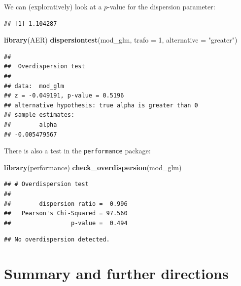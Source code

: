 \documentclass[
]{book}
\newenvironment{Shaded}{\begin{snugshade}}{\end{snugshade}}
\newcommand{\AttributeTok}[1]{\textcolor[rgb]{0.13,0.29,0.53}{#1}}
\newcommand{\CommentTok}[1]{\textcolor[rgb]{0.56,0.35,0.01}{\textit{#1}}}
\newcommand{\DecValTok}[1]{\textcolor[rgb]{0.00,0.00,0.81}{#1}}
\newcommand{\FunctionTok}[1]{\textcolor[rgb]{0.13,0.29,0.53}{\textbf{#1}}}
\newcommand{\NormalTok}[1]{#1}
\newcommand{\SpecialCharTok}[1]{\textcolor[rgb]{0.81,0.36,0.00}{\textbf{#1}}}
\newcommand{\StringTok}[1]{\textcolor[rgb]{0.31,0.60,0.02}{#1}}
\begin{document}
We can (exploratively) look at a \(p\)-value for the dispersion parameter:

\begin{Shaded}
\end{Shaded}

\begin{verbatim}
## [1] 1.104287
\end{verbatim}

\begin{Shaded}
\begin{Highlighting}[]
\FunctionTok{library}\NormalTok{(AER)}
\FunctionTok{dispersiontest}\NormalTok{(mod\_glm, }\AttributeTok{trafo =} \DecValTok{1}\NormalTok{, }\AttributeTok{alternative =} \StringTok{"greater"}\NormalTok{) }
\end{Highlighting}
\end{Shaded}

\begin{verbatim}
## 
##  Overdispersion test
## 
## data:  mod_glm
## z = -0.049191, p-value = 0.5196
## alternative hypothesis: true alpha is greater than 0
## sample estimates:
##        alpha 
## -0.005479567
\end{verbatim}

There is also a test in the \texttt{performance} package:

\begin{Shaded}
\begin{Highlighting}[]
\FunctionTok{library}\NormalTok{(performance)}
\FunctionTok{check\_overdispersion}\NormalTok{(mod\_glm)}
\end{Highlighting}
\end{Shaded}

\begin{verbatim}
## # Overdispersion test
## 
##        dispersion ratio =  0.996
##   Pearson's Chi-Squared = 97.560
##                 p-value =  0.494
\end{verbatim}

\begin{verbatim}
## No overdispersion detected.
\end{verbatim}

\section{Summary and further directions}\label{summary-and-further-directions}
\end{document}
